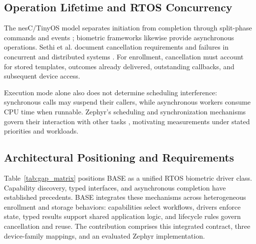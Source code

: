 \subsection{Operation Lifetime and RTOS Concurrency}

The nesC/TinyOS model separates initiation from completion through split-phase commands and events \cite{gay2003nesc}; biometric frameworks likewise provide asynchronous operations. Sethi et al. document cancellation requirements and failures in concurrent and distributed systems \cite{sethi2022cancellation}. For enrollment, cancellation must account for stored templates, outcomes already delivered, outstanding callbacks, and subsequent device access.

Execution mode alone also does not determine scheduling interference: synchronous calls may suspend their callers, while asynchronous workers consume CPU time when runnable. Zephyr's scheduling and synchronization mechanisms govern their interaction with other tasks \cite{zephyr_docs}, motivating measurements under stated priorities and workloads.

\subsection{Architectural Positioning and Requirements}

Table~\ref{tab:gap_matrix} positions BASE as a unified RTOS biometric driver class. Capability discovery, typed interfaces, and asynchronous completion have established precedents. BASE integrates these mechanisms across heterogeneous enrollment and storage behaviors: capabilities select workflows, drivers enforce state, typed results support shared application logic, and lifecycle rules govern cancellation and reuse. The contribution comprises this integrated contract, three device-family mappings, and an evaluated Zephyr implementation.


